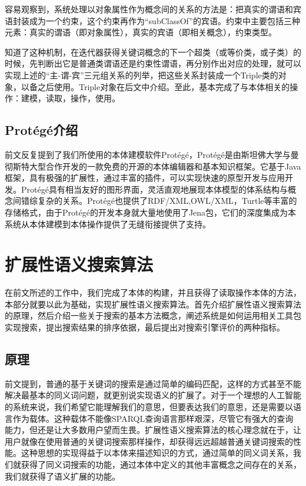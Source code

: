 \documentclass[12pt,a4paper]{article}
\begin{document}
	容易观察到，系统处理以对象属性作为概念间的关系的方法是：把真实的谓语和宾语封装成为一个约束，这个约束再作为“subClassOf”的宾语。约束中主要包括三种元素：真实的谓语（即对象属性），真实的宾语（即相关概念），约束类型。
	
	知道了这种机制，在迭代器获得关键词概念的下一个超类（或等价类，或子类）的时候，先判断出它是普通类谓语还是约束性谓语，再分别作出对应的处理，就可以实现上述的“主-谓-宾”三元组关系的列举，把这些关系封装成一个Triple类的对象，以备之后使用。Triple对象在后文中介绍。至此，基本完成了与本体相关的操作：建模，读取，操作，使用。	
	
	\subsection{Prot{\'e}g{\'e}介绍}	
	前文反复提到了我们所使用的本体建模软件Prot{\'e}g{\'e}，Prot{\'e}g{\'e}是由斯坦佛大学与曼彻斯特大型合作开发的一款免费的开源的本体编辑器和基本知识框架。它基于Java框架，具有极强的扩展性，通过丰富的插件，可以实现快速的原型开发与应用开发。Prot{\'e}g{\'e}具有相当友好的图形界面，灵活直观地展现本体模型的体系结构与概念间错综复杂的关系。Prot{\'e}g{\'e}也提供了RDF/XML,OWL/XML，Turtle等丰富的存储格式，由于Prot{\'e}g{\'e}的开发本身就大量地使用了Jena包，它们的深度集成为本系统从本体建模到本体操作提供了无缝衔接提供了支持。
	
\newpage
\section{扩展性语义搜索算法}
\setcounter{figure}{0}
\setcounter{table}{0}
\setcounter{equation}{0}
	
	在前文所述的工作中，我们完成了本体的构建，并且获得了读取操作本体的方法，本部分就要以此为基础，实现扩展性语义搜索算法。首先介绍扩展性语义搜索算法的原理，然后介绍一些关于搜索的基本方法概念，阐述系统是如何运用相关工具包实现搜索，提出搜索结果的排序依据，最后提出对搜索引擎评价的两种指标。
	\subsection{原理}
	
	前文提到，普通的基于关键词的搜索是通过简单的编码匹配，这样的方式甚至不能解决最基本的同义词问题，就更别说实现语义的扩展了。对于一个理想的人工智能的系统来说，我们希望它能理解我们的意思，但要表达我们的意思，还是需要以语言作为载体。这种载体不能像SPARQL查询语言那样艰深，尽管它有强大的查询能力，但还是让大多数用户望而生畏。扩展性语义搜索算法的核心理念就在于，让用户就像在使用普通的关键词搜索那样操作，却获得远远超越普通关键词搜索的性能。这种思想的实现得益于以本体来描述知识的方式，通过简单的同义词关系，我们就获得了同义词搜索的功能，通过本体中定义的其他丰富概念之间存在的关系，我们就获得了语义扩展的功能。
	
\end{document}
